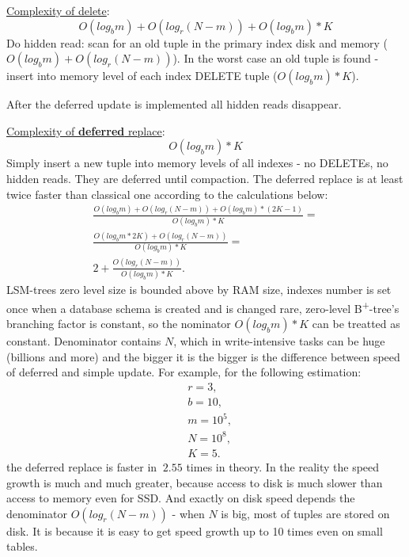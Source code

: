 \documentclass{vldb}
\begin{document}
\underline{Complexity of delete}:
\begin{displaymath}
O(log_bm) + O(log_r(N - m)) + O(log_bm) * K
\end{displaymath}
Do hidden read: scan for an old tuple in the primary index disk and memory
($O(log_bm) + O(log_r(N - m))$). In the worst case an old tuple is found -
insert into memory level of each index DELETE tuple ($O(log_bm) * K$).

After the deferred update is implemented all hidden reads disappear.

\underline{Complexity of \textbf{deferred} replace}:
\begin{displaymath}
O(log_bm) * K
\end{displaymath}
Simply insert a new tuple into memory levels of all indexes - no DELETEs, no
hidden reads. They are deferred until compaction. The deferred replace is at
least twice faster than classical one according to the calculations below:
\begin{gather*}
\frac{O(log_bm) + O(log_r(N - m)) + O(log_bm) * (2K - 1)}{O(log_bm) * K} = \\
\frac{O(log_bm * 2K) + O(log_r(N - m))}{O(log_bm) * K} = \\
2 + \frac{O(log_r(N - m))}{O(log_bm) * K}.
\end{gather*}
LSM-trees zero level size is bounded above by RAM size, indexes number is set
once when a database schema is created and is changed rare, zero-level
B\textsuperscript{+}-tree's branching factor is constant, so the nominator
$O(log_bm) * K$ can be treatted as constant. Denominator contains $N$, which
in write-intensive tasks can be huge (billions and more) and the bigger it is
the bigger is the difference between speed of deferred and simple update.
For example, for the following estimation:
\begin{align*}
&r = 3, \\
&b = 10, \\
&m = 10^5, \\
&N = 10^8, \\
&K = 5.
\end{align*}
the deferred replace is faster in $~2.55$ times in theory. In the reality the
speed growth is much and much greater, because access to disk is much slower
than access to memory even for SSD. And exactly on disk speed depends the
denominator $O(log_r(N - m))$ - when $N$ is big, most of tuples are stored on
disk. It is because it is easy to get speed growth up to 10 times even on small
tables.
\end{document}
